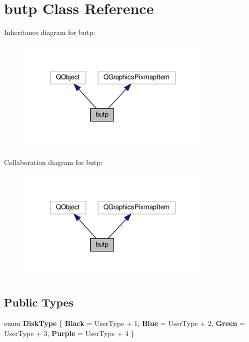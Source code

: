\hypertarget{classbutp}{}\section{butp Class Reference}
\label{classbutp}


Inheritance diagram for butp\+:
\nopagebreak
\begin{figure}[H]
\begin{center}
\leavevmode
\includegraphics[width=268pt]{classbutp__inherit__graph}
\end{center}
\end{figure}


Collaboration diagram for butp\+:
\nopagebreak
\begin{figure}[H]
\begin{center}
\leavevmode
\includegraphics[width=268pt]{classbutp__coll__graph}
\end{center}
\end{figure}
\subsection*{Public Types}
\begin{DoxyCompactItemize}
\item 
\mbox{\label{classbutp_a5da9f507b30a431c244aca25cd0418f0}} 
enum {\bfseries Disk\+Type} \{ {\bfseries Black} = User\+Type + 1, 
{\bfseries Blue} = User\+Type + 2, 
{\bfseries Green} = User\+Type + 3, 
{\bfseries Purple} = User\+Type + 4
 \}
\end{DoxyCompactItemize}
